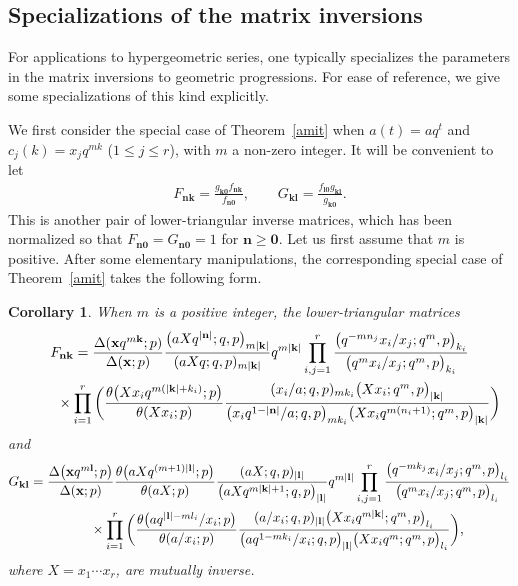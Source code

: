 \documentclass[pdftex]{sigma}%
\numberwithin{equation}{section}
\newtheorem{Corollary}[Theorem]{Corollary}
\newcommand\bn{\mathbf n}
\newcommand\bk{\mathbf k}
\newcommand\bl{\mathbf l}
\newcommand\bx{\mathbf x}
\begin{document}
\subsection{Specializations of the matrix inversions}\label{smis}

For applications to hypergeometric series, one typically specializes the parameters in the matrix inversions to geometric progressions. For ease of reference, we give some specializations of this kind explicitly.

We first consider the special case of Theorem~\ref{amit} when
$a(t)=aq^t$ and $c_j(k)=x_jq^{mk}$ ($1\leq j\leq r$),
with $m$ a non-zero integer. It will be convenient to let
\begin{gather*}
F_{\bn \bk}=\frac{g_{\bk \mathbf 0} f_{\bn \bk}}{f_{\bn \mathbf 0}},
\qquad G_{\bk \bl}=\frac{f_{\bl \mathbf 0} g_{\bk \bl}}{g_{\bk \mathbf 0}}.
\end{gather*}
This is another pair of lower-triangular inverse matrices, which has been normalized
so that $F_{\bn \mathbf 0}=G_{\bn \mathbf 0}=1$ for $\mathbf n\geq\mathbf 0$.
Let us first assume that $m$ is positive. After some elementary manipulations, the corresponding special case of Theorem~\ref{amit} takes the following form.

\begin{Corollary}\label{amipc}
When $m$ is a positive integer, the
lower-triangular matrices
\begin{gather*}
F_{\bf nk}=\frac{\Delta(\bx q^{m\bk};p)}{\Delta(\bx;p)}\frac{\big(aXq^{|\bn|};q,p\big)_{m|\bk|}}{(aXq;q,p)_{m|\bk|}} q^{m|\bk|}
\prod\limits_{i,j=1}^r\frac{\big(q^{-mn_j}x_i/x_j;q^m,p\big)_{k_i}}{\big(q^mx_i/x_j;q^m,p\big)_{k_i}}
\\ \phantom{F_{\bf nk}=}{}
\times
\prod\limits_{i=1}^r\bigg(\frac{\theta\big(Xx_iq^{m(|\bk|+k_i)};p\big)}{\theta(Xx_i;p)}
\frac{(x_i/a;q,p)_{mk_i}\big(Xx_i;q^m,p\big)_{|\bk|}}{\big(x_iq^{1-|\bn|}/a;q,p\big)_{mk_i}
\big(Xx_iq^{m(n_i+1)};q^m,p\big)_{|\bk|}}\bigg)
\end{gather*}
and
\begin{gather*}
G_{\bf kl}=\frac{\Delta\big(\bx q^{m\bl};p\big)}{\Delta(\bx;p)}\frac{\theta \big(aXq^{(m+1)|\bl|};p\big)}{\theta(aX;p)}\frac{(aX;q,p)_{|\bl|}}{\big(aXq^{m|\bk|+1};q,p\big)_{|\bl|}} q^{m|\bl|}
\prod\limits_{i,j=1}^r\frac{\big(q^{-mk_j}x_i/x_j;q^m,p\big)_{l_i}}{\big(q^mx_i/x_j;q^m,p\big)_{l_i}}
\\ \phantom{G_{\bf kl}=}{}
\times
\prod\limits_{i=1}^r\bigg(\frac{\theta\big(aq^{|\bl|-ml_i}/x_i;p\big)}{\theta(a/x_i;p)}
\frac{(a/x_i;q,p)_{|\bl|}\big(Xx_iq^{m|\bk|};q^m,p\big)_{l_i}}{\big(aq^{1-mk_i}/x_i;q,p\big)_{|\bl|}
\big(Xx_iq^m;q^m,p\big)_{l_i}}\bigg),
\end{gather*}
where $X=x_1\dotsm x_r$, are mutually inverse.
\end{Corollary}
\end{document}
